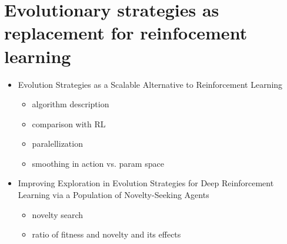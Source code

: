\section{Evolutionary strategies as replacement for reinfocement learning}
\label{sec:es-reinf}
\begin{itemize}
    \item Evolution Strategies as a Scalable Alternative to Reinforcement Learning \cite{salimans2017} \begin{itemize}
        \item algorithm description
        \item comparison with RL
        \item paralellization
        \item smoothing in action vs. param space
    \end{itemize}
    \item Improving Exploration in Evolution Strategies for Deep Reinforcement Learning via a Population of Novelty-Seeking Agents \cite{conti2018} \begin{itemize}
        \item novelty search
        \item ratio of fitness and novelty and its effects
    \end{itemize}
\end{itemize}